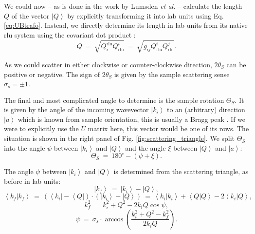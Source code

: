 We could now -- as is done in the work by Lumsden \textit{et al.} \cite{Lumsden2005} -- calculate the length
$Q$ of the vector $\left| Q \right>$ by explicitly transforming it into lab units using Eq. \ref{eq:UBtrafo}.
Instead, we directly determine its length in lab units from its native rlu system using the covariant dot 
product \cite[p. 808]{Arens2015}:
\begin{equation}
	Q %
	\ =\ 
	\sqrt{Q^{\mathrm{rlu}}_i Q_{\mathrm{rlu}}^i} \ =\  \sqrt{g_{ij} Q_{\mathrm{rlu}}^i Q_{\mathrm{rlu}}^j}.
\end{equation}

As we could scatter in either clockwise or counter-clockwise direction, $2 \theta_S$ can be positive or negative.
The sign of $2 \theta_S$ is given by the sample scattering sense $\sigma_s = \pm 1$.




The final and most complicated angle to determine is the sample rotation $\Theta_S$.
It is given by the angle of the incoming wavevector $\left| k_i \right>$ to an (arbitrary) direction 
$\left| a \right>$ which is known from sample orientation, this is usually a Bragg peak \cite[p. 87]{Shirane2002}.
If we were to explicitly use the $U$ matrix here, this vector would be one of its rows.
The situation is shown in the right panel of Fig. \ref{fig:scattering_triangle}.
We split $\Theta_S$ into the angle $\psi$ between $\left| k_i \right>$ and $\left| Q \right>$ 
and the angle $\xi$ between $\left| Q \right>$ and $\left| a \right>$:
\begin{equation} \boxed{ \Theta_S \ =\  180^{\circ} - \left( \psi + \xi \right).} \end{equation}




The angle $\psi$ between $\left| k_i \right>$ and $\left| Q \right>$ is determined from the scattering triangle, as before
in lab units:
\begin{equation}
	\left| k_f \right> \ =\  \left| k_i \right> - \left| Q \right>,
\end{equation}
\begin{equation} 
	\left< k_f | k_f \right> \ =\  \left( \left< k_i \right| - \left< Q \right| \right) \cdot \left( \left| k_i \right> - \left| Q \right> \right)
	\ =\  \left< k_i | k_i \right> + \left< Q | Q \right> - 2 \left< k_i | Q \right>,
\end{equation}
\begin{equation}
	k_f^2 \ =\  k_i^2 + Q^2 - 2 k_i Q \cos \psi,
\end{equation}
\begin{equation}
	\boxed{ \psi \ =\  \sigma_s \cdot \arccos \left( \frac{k_i^2 + Q^2 - k_f^2}{2 k_i Q} \right).}
\end{equation}


